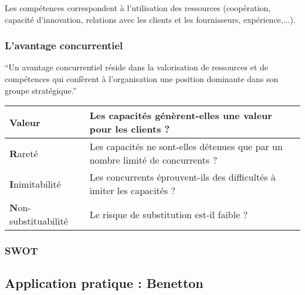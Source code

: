 		Les compétences correspondent à l'utilisation des ressources (coopération, capacité d'innovation, relations avec les clients et les fournisseurs, expérience,...).
	\subsubsection{L'avantage concurrentiel}
		\enquote{Un avantage concurrentiel réside dans la valorisation
		de ressources et de compétences qui confèrent à l'organisation
	une position dominante dans son groupe stratégique.}
		
		\bigskip
		
		\begin{tabular}{l|p{10cm}}
			\textbf{V}aleur & Les capacités génèrent-elles une valeur pour les clients ?\\
			\hline
			\textbf{R}areté & Les capacités ne sont-elles détenues que par un nombre limité de concurrents ?\\
			\hline
			\textbf{I}nimitabilité & Les concurrents éprouvent-ils des difficultés à imiter les capacités ?\\
			\hline
			\textbf{N}on-substituabilité & Le risque de substitution est-il faible ?\\
		\end{tabular}
	\subsubsection{SWOT}

\subsection{Application pratique : Benetton}

